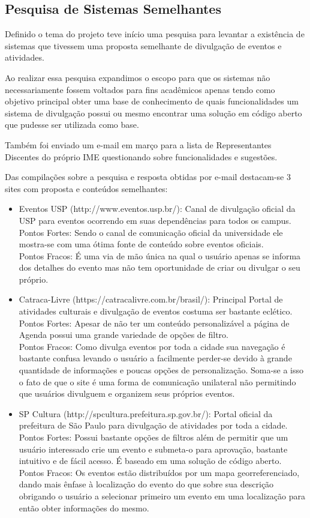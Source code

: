 \subsection{Pesquisa de Sistemas Semelhantes}
\par Definido o tema do projeto teve início uma pesquisa para levantar a existência de sistemas que tivessem uma proposta semelhante de divulgação de eventos e atividades.
\par Ao realizar essa pesquisa expandimos o escopo para que os sistemas não necessariamente fossem voltados para fins acadêmicos apenas tendo como objetivo principal obter uma base de conhecimento de quais funcionalidades um sistema de divulgação possui ou mesmo encontrar uma solução em código aberto que pudesse ser utilizada como base.
 \par Também foi enviado um e-mail em março para a lista de Representantes Discentes do próprio IME questionando sobre funcionalidades e sugestões.
\par Das compilações sobre a pesquisa e resposta obtidas por e-mail destacam-se 3 sites com proposta e conteúdos semelhantes:
\begin{itemize}
\item{Eventos USP (http://www.eventos.usp.br/):}
Canal de divulgação oficial da USP para eventos ocorrendo em suas dependências para todos os campus.\\
Pontos Fortes: Sendo o canal de comunicação oficial da universidade ele mostra-se com uma ótima fonte de conteúdo sobre eventos oficiais.\\
Pontos Fracos: É uma via de mão única na qual o usuário apenas se informa dos detalhes do evento mas não tem oportunidade de criar ou divulgar o seu próprio.
\item {Catraca-Livre (https://catracalivre.com.br/brasil/):} Principal Portal de atividades culturais e divulgação de eventos costuma ser bastante eclético. \\
Pontos Fortes: Apesar de não ter um conteúdo personalizável a página de Agenda possui uma grande variedade de opções de filtro.\\
Pontos Fracos: Como divulga eventos por toda a cidade sua navegação é bastante confusa levando o usuário a facilmente perder-se devido à grande quantidade de informações e poucas opções de personalização. Soma-se a isso o fato de que o site é uma forma de comunicação unilateral não permitindo que usuários divulguem e organizem seus próprios eventos.\\
\item {SP Cultura (http://spcultura.prefeitura.sp.gov.br/):} Portal oficial da prefeitura de São Paulo para divulgação de atividades por toda a cidade.\\
Pontos Fortes: Possui bastante opções de filtros além de permitir que um usuário interessado crie um evento e submeta-o para aprovação, bastante intuitivo e de fácil acesso. É baseado em uma solução de código aberto.\\
Pontos Fracos: Os eventos estão distribuídos por um mapa georreferenciado, dando mais ênfase à localização do evento do que sobre sua descrição obrigando o usuário a selecionar primeiro um evento em uma localização para então obter informações do mesmo.
\end{itemize}
